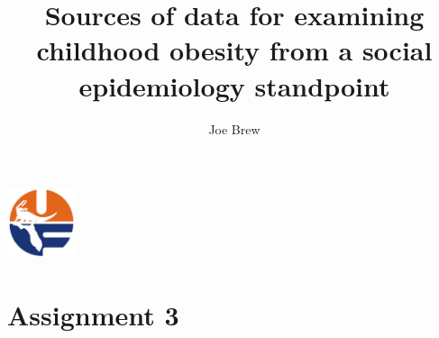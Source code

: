 \documentclass[11pt]{article}
\begin{document}


\title{\textbf{Sources of data for examining childhood obesity from a social epidemiology standpoint}}
\author{Joe Brew}


\maketitle
\tableofcontents

\vspace{70mm}

\begin{center}
\includegraphics[width=2cm]{uf}
\end{center}





\fancyhfoffset[E,O]{0pt}


\section*{Assignment 3}
\hrulefill
\end{document}
